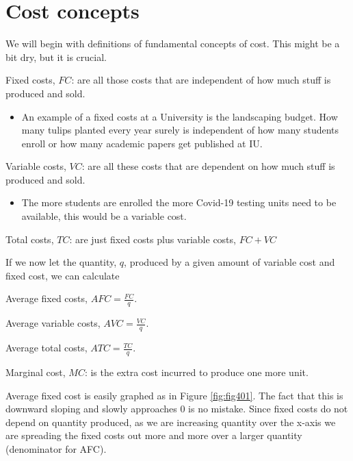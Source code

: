 \documentclass[
]{book}
\providecommand{\tightlist}{%
  \setlength{\itemsep}{0pt}\setlength{\parskip}{0pt}}
\begin{document}
\hypertarget{cost-concepts}{%
\section{Cost concepts}\label{cost-concepts}}

We will begin with definitions of fundamental concepts of cost. This might be a bit dry, but it is crucial.

Fixed costs, \(FC\): are all those costs that are independent of how much stuff is produced and sold.

\begin{itemize}
\tightlist
\item
  An example of a fixed costs at a University is the landscaping budget. How many tulips planted every year surely is independent of how many students enroll or how many academic papers get published at IU.
\end{itemize}

Variable costs, \(VC\): are all these costs that are dependent on how much stuff is produced and sold.

\begin{itemize}
\tightlist
\item
  The more students are enrolled the more Covid-19 testing units need to be available, this would be a variable cost.
\end{itemize}

Total costs, \(TC\): are just fixed costs plus variable costs, \(FC + VC\)

If we now let the quantity, \(q\), produced by a given amount of variable cost and fixed cost, we can calculate

Average fixed costs, \(AFC = \frac{FC}{q}\).

Average variable costs, \(AVC = \frac{VC}{q}\).

Average total costs, \(ATC = \frac{TC}{q}\).

Marginal cost, \(MC\): is the extra cost incurred to produce one more unit.

Average fixed cost is easily graphed as in Figure \ref{fig:fig401}. The fact that this is downward sloping and slowly approaches 0 is no mistake. Since fixed costs do not depend on quantity produced, as we are increasing quantity over the x-axis we are spreading the fixed costs out more and more over a larger quantity (denominator for AFC).
\end{document}
